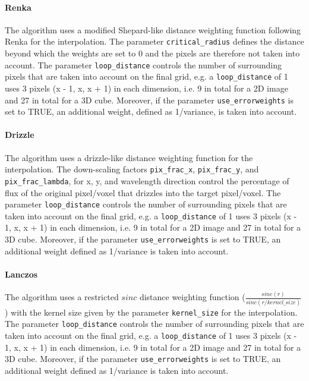 \paragraph{Renka}
\label{resampling:algorithms:renka}
The algorithm uses a modified Shepard-like distance weighting function following
Renka for the interpolation. The parameter \verb+critical_radius+ defines the
distance beyond which the weights are set to 0 and the pixels are therefore not
taken into account. The parameter \verb+loop_distance+ controls the number of
surrounding pixels that are taken into account on the final grid, e.g. a
\verb+loop_distance+ of 1 uses 3 pixels (x - 1, x, x + 1) in each dimension,
i.e.  9 in total for a 2D image and 27 in total for a 3D cube. Moreover, if the
parameter \verb+use_errorweights+ is set to TRUE,
an additional weight, defined as 1/variance, is taken into account\footnotemark[\value{footnote}].

\paragraph{Drizzle}
\label{resampling:algorithms:drizzle}
The algorithm uses a drizzle-like distance weighting function for the
interpolation. The down-scaling factors \verb+pix_frac_x+, \verb+pix_frac_y+,
and \verb+pix_frac_lambda+, for x, y, and wavelength direction control the
percentage of flux of the original pixel/voxel that drizzles into the target
pixel/voxel. The parameter \verb+loop_distance+ controls the number of
surrounding pixels that are taken into account on the final grid, e.g. a
\verb+loop_distance+ of 1 uses 3 pixels (x - 1, x, x + 1) in each dimension,
i.e.  9 in total for a 2D image and 27 in total for a 3D cube. Moreover, if the
parameter \verb+use_errorweights+ is set to TRUE,
an additional weight defined as 1/variance is taken into account\footnotemark[\value{footnote}].

\paragraph{Lanczos}
\label{resampling:algorithms:lanczos}
The algorithm uses a restricted $sinc$ distance weighting function
($\frac{sinc(r)}{sinc(r/kernel\_size)}$) with the kernel size given by the
parameter \verb+kernel_size+ for the interpolation. The parameter
\verb+loop_distance+ controls the number of surrounding pixels that are taken
into account on the final grid, e.g. a \verb+loop_distance+ of 1 uses 3 pixels
(x - 1, x, x + 1) in each dimension, i.e.  9 in total for a 2D image and 27 in
total for a 3D cube. Moreover, if the parameter \verb+use_errorweights+ is set
to TRUE, an additional weight defined as
1/variance is taken into account\footnotemark[\value{footnote}].



